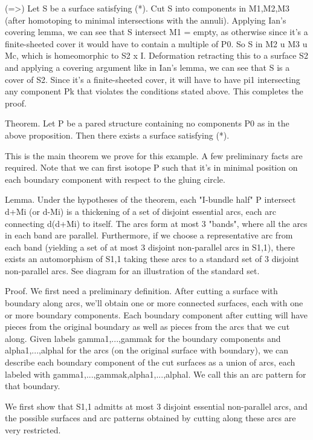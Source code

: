 \documentclass[12pt]{amsart}
\theoremstyle{definition}
\begin{document}
(=>) Let S be a surface satisfying (*). Cut S into components in M1,M2,M3
(after homotoping to minimal intersections with the annuli). Applying Ian's
covering lemma, we can see that S intersect M1 = empty, as otherwise since it's
a finite-sheeted cover it would have to contain a multiple of P0.
So S in M2 u M3 u Mc, which is homeomorphic to S2 x I. Deformation retracting
this to a surface S2 and applying a covering argument like in Ian's lemma, we
can see that S is a cover of S2. Since it's a finite-sheeted cover, it will
have to have pi1 intersecting any component Pk that violates the conditions
stated above. This completes the proof.

Theorem. Let P be a pared structure containing no components P0 as in the above
proposition. Then there exists a surface satisfying (*).

This is the main theorem we prove for this example. A few preliminary facts are
required. Note that we can first isotope P such that it's in minimal position
on each boundary component with respect to the gluing circle.

Lemma. Under the hypotheses of the theorem, each "I-bundle half" P intersect
d+Mi (or d-Mi) is a thickening of a set of disjoint essential arcs, each arc
connecting d(d+Mi) to itself. The arcs form at most 3 "bands", where all the
arcs in each band are parallel.  Furthermore, if we choose a representative arc
from each band (yielding a set of at most 3 disjoint non-parallel arcs in
S1,1), there exists an automorphism of S1,1 taking these arcs to a standard set
of 3 disjoint non-parallel arcs.  See diagram for an illustration of the
standard set.

Proof. We first need a preliminary definition. After cutting a surface with
boundary along arcs, we'll obtain one or more connected surfaces, each with one
or more boundary components. Each boundary component after cutting will have
pieces from the original boundary as well as pieces from the arcs that we cut
along. Given labels gamma1,...,gammak for the boundary components and
alpha1,...,alphal for the arcs (on the original surface with boundary), we can
describe each boundary component of the cut surfaces as a union of arcs, each
labeled with gamma1,...,gammak,alpha1,...,alphal. We call this an arc pattern
for that boundary.

We first show that S1,1 admitts at most 3 disjoint essential non-parallel arcs,
and the possible surfaces and arc patterns obtained by cutting along these arcs
are very restricted.
\end{document}
